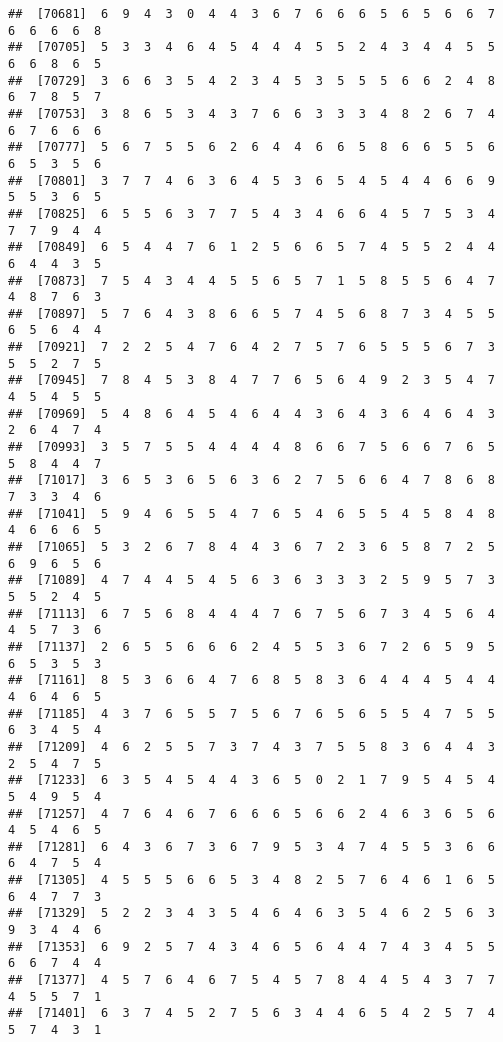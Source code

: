 \documentclass[
]{book}
\begin{document}
\begin{verbatim}
##  [70681]  6  9  4  3  0  4  4  3  6  7  6  6  6  5  6  5  6  6  7  6  6  6  6  8
##  [70705]  5  3  3  4  6  4  5  4  4  4  5  5  2  4  3  4  4  5  5  6  6  8  6  5
##  [70729]  3  6  6  3  5  4  2  3  4  5  3  5  5  5  6  6  2  4  8  6  7  8  5  7
##  [70753]  3  8  6  5  3  4  3  7  6  6  3  3  3  4  8  2  6  7  4  6  7  6  6  6
##  [70777]  5  6  7  5  5  6  2  6  4  4  6  6  5  8  6  6  5  5  6  6  5  3  5  6
##  [70801]  3  7  7  4  6  3  6  4  5  3  6  5  4  5  4  4  6  6  9  5  5  3  6  5
##  [70825]  6  5  5  6  3  7  7  5  4  3  4  6  6  4  5  7  5  3  4  7  7  9  4  4
##  [70849]  6  5  4  4  7  6  1  2  5  6  6  5  7  4  5  5  2  4  4  6  4  4  3  5
##  [70873]  7  5  4  3  4  4  5  5  6  5  7  1  5  8  5  5  6  4  7  4  8  7  6  3
##  [70897]  5  7  6  4  3  8  6  6  5  7  4  5  6  8  7  3  4  5  5  6  5  6  4  4
##  [70921]  7  2  2  5  4  7  6  4  2  7  5  7  6  5  5  5  6  7  3  5  5  2  7  5
##  [70945]  7  8  4  5  3  8  4  7  7  6  5  6  4  9  2  3  5  4  7  4  5  4  5  5
##  [70969]  5  4  8  6  4  5  4  6  4  4  3  6  4  3  6  4  6  4  3  2  6  4  7  4
##  [70993]  3  5  7  5  5  4  4  4  4  8  6  6  7  5  6  6  7  6  5  5  8  4  4  7
##  [71017]  3  6  5  3  6  5  6  3  6  2  7  5  6  6  4  7  8  6  8  7  3  3  4  6
##  [71041]  5  9  4  6  5  5  4  7  6  5  4  6  5  5  4  5  8  4  8  4  6  6  6  5
##  [71065]  5  3  2  6  7  8  4  4  3  6  7  2  3  6  5  8  7  2  5  6  9  6  5  6
##  [71089]  4  7  4  4  5  4  5  6  3  6  3  3  3  2  5  9  5  7  3  5  5  2  4  5
##  [71113]  6  7  5  6  8  4  4  4  7  6  7  5  6  7  3  4  5  6  4  4  5  7  3  6
##  [71137]  2  6  5  5  6  6  6  2  4  5  5  3  6  7  2  6  5  9  5  6  5  3  5  3
##  [71161]  8  5  3  6  6  4  7  6  8  5  8  3  6  4  4  4  5  4  4  4  6  4  6  5
##  [71185]  4  3  7  6  5  5  7  5  6  7  6  5  6  5  5  4  7  5  5  6  3  4  5  4
##  [71209]  4  6  2  5  5  7  3  7  4  3  7  5  5  8  3  6  4  4  3  2  5  4  7  5
##  [71233]  6  3  5  4  5  4  4  3  6  5  0  2  1  7  9  5  4  5  4  5  4  9  5  4
##  [71257]  4  7  6  4  6  7  6  6  6  5  6  6  2  4  6  3  6  5  6  4  5  4  6  5
##  [71281]  6  4  3  6  7  3  6  7  9  5  3  4  7  4  5  5  3  6  6  6  4  7  5  4
##  [71305]  4  5  5  5  6  6  5  3  4  8  2  5  7  6  4  6  1  6  5  6  4  7  7  3
##  [71329]  5  2  2  3  4  3  5  4  6  4  6  3  5  4  6  2  5  6  3  9  3  4  4  6
##  [71353]  6  9  2  5  7  4  3  4  6  5  6  4  4  7  4  3  4  5  5  6  6  7  4  4
##  [71377]  4  5  7  6  4  6  7  5  4  5  7  8  4  4  5  4  3  7  7  4  5  5  7  1
##  [71401]  6  3  7  4  5  2  7  5  6  3  4  4  6  5  4  2  5  7  4  5  7  4  3  1

\end{verbatim}
\end{document}
